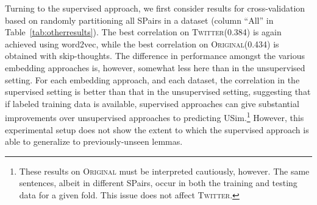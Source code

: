 \documentclass[11pt]{article}
\newcommand\original{\textsc{Original}\xspace}
\newcommand\twitter{\textsc{Twitter}\xspace}
\newcommand{\tabref}[1]{Table~\ref{#1}}
\begin{document}

Turning to the supervised approach, we first consider results for
cross-validation based on randomly partitioning all SPairs in a
dataset (column ``All'' in \tabref{tab:otherresults}). The best
correlation on \twitter (0.384) is again achieved using word2vec,
while the best correlation on \original (0.434) is obtained with
skip-thoughts. The difference in performance amongst the various
embedding approaches is, however, somewhat less here than in the
unsupervised setting. For each embedding approach, and each dataset,
the correlation in the supervised setting is better than that in the
unsupervised setting, suggesting that if labeled training data is
available, supervised approaches can give substantial improvements
over unsupervised approaches to predicting USim.\footnote{These
  results on \original must be interpreted cautiously, however. The
  same sentences, albeit in different SPairs, occur in both the
  training and testing data for a given fold. This issue does not
  affect \twitter.} However, this experimental setup does not show the
extent to which the supervised approach is able to generalize to
previously-unseen lemmas.

\end{document}
